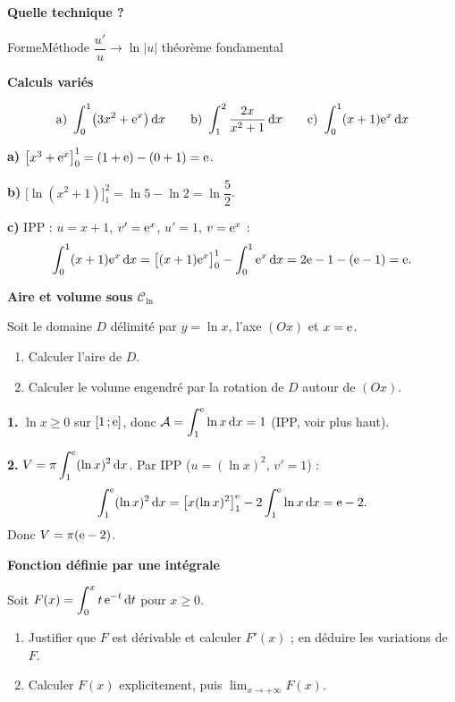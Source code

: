 \begin{methode}
	\textbf{Quelle technique ?}
	\begin{tabmethode}[0.52]{Forme}{Méthode}
		      {$\dfrac{u'}{u}\to\ln|u|$}
		      {théorème fondamental}
	\end{tabmethode}
\end{methode}

\exerciceresolu
\textbf{Calculs variés}

\[
\text{a) } \int_0^1\bigl(3x^{2}+\mathrm{e}^{x}\bigr)\,\mathrm{d} x
\qquad
\text{b) } \int_1^{2}\frac{2x}{x^{2}+1}\,\mathrm{d} x
\qquad
\text{c) } \int_0^{1}(x+1)\mathrm{e}^{x}\,\mathrm{d} x
\]

\solution

\textbf{a)} $\bigl[x^{3}+\mathrm{e}^{x}\bigr]_0^1=(1+\mathrm{e})-(0+1)=\mathrm{e}$.

\textbf{b)} $\bigl[\ln(x^{2}+1)\bigr]_1^{2}=\ln 5-\ln 2=\ln\dfrac52$.

\textbf{c)} IPP : $u=x+1$, $v'=\mathrm{e}^{x}$, $u'=1$, $v=\mathrm{e}^{x}$ :
\[
\int_0^1(x+1)\mathrm{e}^{x}\,\mathrm{d} x=\bigl[(x+1)\mathrm{e}^{x}\bigr]_0^1-\int_0^1\mathrm{e}^{x}\,\mathrm{d} x
=2\mathrm{e}-1-(\mathrm{e}-1)=\mathrm{e}.
\]

\bigskip
\exerciceresolu
\textbf{Aire et volume sous $\mathcal C_{\ln}$}

Soit le domaine $D$ délimité par $y=\ln x$, l'axe $(Ox)$ et $x=\mathrm{e}$.
\begin{enumerate}
	\item Calculer l'aire de $D$.
	\item Calculer le volume engendré par la rotation de $D$ autour de $(Ox)$.
\end{enumerate}

\solution

\textbf{1.} $\ln x\geq 0$ sur $[1\,;\mathrm{e}]$, donc
$\mathcal A=\displaystyle\int_1^{\mathrm{e}}\ln x\,\mathrm{d} x=1$ (IPP, voir plus haut).

\textbf{2.} $V=\pi\displaystyle\int_1^{\mathrm{e}}(\ln x)^{2}\,\mathrm{d} x$. Par IPP
($u=(\ln x)^{2}$, $v'=1$) :
\[
\int_1^{\mathrm{e}}(\ln x)^{2}\,\mathrm{d} x
=\bigl[x(\ln x)^{2}\bigr]_1^{\mathrm{e}}-2\int_1^{\mathrm{e}}\ln x\,\mathrm{d} x
=\mathrm{e}-2.
\]
Donc $V=\pi(\mathrm{e}-2)$.

\bigskip
\exerciceresolu
\textbf{Fonction définie par une intégrale}

Soit $F(x)=\displaystyle\int_0^{x}t\,\mathrm{e}^{-t}\,\mathrm{d} t$ pour $x\geq 0$.
\begin{enumerate}
	\item Justifier que $F$ est dérivable et calculer $F'(x)$ ; en déduire les
	variations de $F$.
	\item Calculer $F(x)$ explicitement, puis $\displaystyle\lim_{x\to+\infty}F(x)$.
\end{enumerate}

